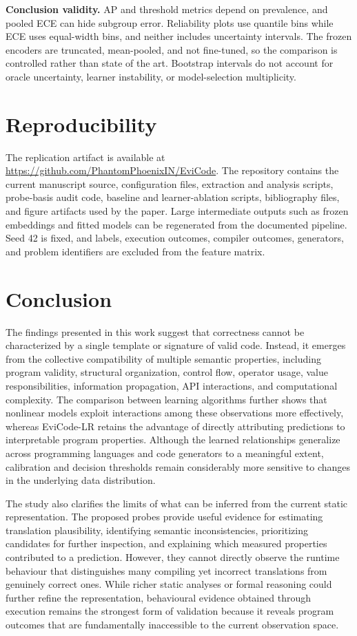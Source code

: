 \documentclass[conference]{IEEEtran}
\begin{document}
\textbf{Conclusion validity.} AP and threshold metrics depend on prevalence, and pooled ECE can hide subgroup error. Reliability plots use quantile bins while ECE uses equal-width bins, and neither includes uncertainty intervals. The frozen encoders are truncated, mean-pooled, and not fine-tuned, so the comparison is controlled rather than state of the art. Bootstrap intervals do not account for oracle uncertainty, learner instability, or model-selection multiplicity.

\section{Reproducibility}
The replication artifact is available at \url{https://github.com/PhantomPhoenixIN/EviCode}. The repository contains the current manuscript source, configuration files, extraction and analysis scripts, probe-basis audit code, baseline and learner-ablation scripts, bibliography files, and figure artifacts used by the paper. Large intermediate outputs such as frozen embeddings and fitted models can be regenerated from the documented pipeline. Seed 42 is fixed, and labels, execution outcomes, compiler outcomes, generators, and problem identifiers are excluded from the feature matrix.

\section{Conclusion}
The findings presented in this work suggest that correctness cannot be characterized by a single template or signature of valid code. Instead, it emerges from the collective compatibility of multiple semantic properties, including program validity, structural organization, control flow, operator usage, value responsibilities, information propagation, API interactions, and computational complexity. The comparison between learning algorithms further shows that nonlinear models exploit interactions among these observations more effectively, whereas EviCode-LR retains the advantage of directly attributing predictions to interpretable program properties. Although the learned relationships generalize across programming languages and code generators to a meaningful extent, calibration and decision thresholds remain considerably more sensitive to changes in the underlying data distribution.

The study also clarifies the limits of what can be inferred from the current static representation. The proposed probes provide useful evidence for estimating translation plausibility, identifying semantic inconsistencies, prioritizing candidates for further inspection, and explaining which measured properties contributed to a prediction. However, they cannot directly observe the runtime behaviour that distinguishes many compiling yet incorrect translations from genuinely correct ones. While richer static analyses or formal reasoning could further refine the representation, behavioural evidence obtained through execution remains the strongest form of validation because it reveals program outcomes that are fundamentally inaccessible to the current observation space.
\end{document}
